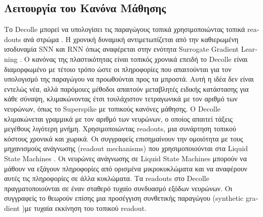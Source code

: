 \documentclass[12pt]{report}
\begin{document}
\subsection{Λειτουργία του Κανόνα Μάθησης}
Το \textlatin{Decolle} μπορεί να υπολογίσει τις παραγώγους τοπικά χρησιμοποιώντας τοπικά \textlatin{readouts } ανά στρώμα \cite{neftci2017}. Η χρονική δυναμική αντιμετωπίζεται από την καθιερωμένη ισοδυναμία \textlatin{SNN} και \textlatin{RNN} όπως αναφέρεται στην ενότητα \textlatin{Surrogate Gradient Learning }\cite{neft2019}. Ο κανόνας της πλαστικότητας είναι τοπικός χρονικά επειδή το \textlatin{Decolle} είναι διαμορφωμένο με τέτοιο τρόπο ώστε οι πληροφορίες που απαιτούνται για τον υπολογισμό της παραγώγου να προωθούνται προς τα μπροστά. Αυτή η ιδέα δεν είναι εντελώς νέα, αλλά παρόμοιες μέθοδοι απαιτούν μεταβλητές ειδικής κατάστασης για κάθε σύναψη, κλιμακώνοντας έτσι τουλάχιστον τετραγωνικά με τον αριθμό των νευρώνων, όπως το \textlatin{Superspike} με τοπικούς κανόνες μάθησης. Ο \textlatin{Decolle} κλιμακώνεται γραμμικά με τον αριθμό των νευρώνων, ο οποίος απαιτεί τάξεις μεγέθους λιγότερη μνήμη. Χρησιμοποιώντας \textlatin{readouts}, μια συνάρτηση τοπικού κόστους χρονικά και χωρικά. Οι συγγραφείς επισημαίνουν την ομοιότητα με τους μηχανισμούς ανάγνωσης (\textlatin{readout mechanisms}) που χρησιμοποιούνται στα \textlatin{ Liquid State Machines} \cite{markram2002}. Οι νευρώνες ανάγνωσης σε \textlatin{ Liquid State Machines} μπορούν να μάθουν να εξάγουν πληροφορίες από ορισμένα μικροκυκλώματα και να αναφέρουν αυτές τις πληροφορίες σε άλλα κυκλώματα. Τα \textlatin{readouts} στο \textlatin{Decolle} πραγματοποιούνται σε έναν σταθερό τυχαίο συνδυασμό εξόδων νευρώνων. Οι συγγραφείς το θεωρούν επίσης μια προσέγγιση συνθετικής παραγώγου (\textlatin{synthetic gradient })με τυχαία εκκίνηση του τοπικού \textlatin{readout}.
\end{document}
